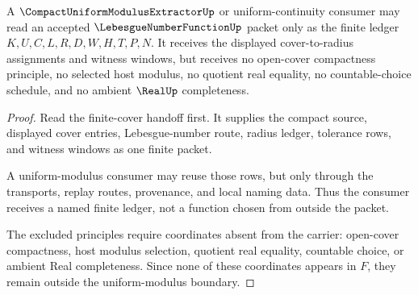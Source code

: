 \begin{theorem}
\label{thm:lebesgue-number-function-uniform-modulus-boundary}
A $\CompactUniformModulusExtractorUp$ or uniform-continuity consumer may read an accepted $\LebesgueNumberFunctionUp$ packet only as the finite ledger $K,U,C,L,R,D,W,H,T,P,N$. It receives the displayed cover-to-radius assignments and witness windows, but receives no open-cover compactness principle, no selected host modulus, no quotient real equality, no countable-choice schedule, and no ambient $\RealUp$ completeness.
\end{theorem}
\begin{proof}
Read the finite-cover handoff first. It supplies the compact source, displayed cover entries, Lebesgue-number route, radius ledger, tolerance rows, and witness windows as one finite packet.

A uniform-modulus consumer may reuse those rows, but only through the transports, replay routes, provenance, and local naming data. Thus the consumer receives a named finite ledger, not a function chosen from outside the packet.

The excluded principles require coordinates absent from the carrier: open-cover compactness, host modulus selection, quotient real equality, countable choice, or ambient Real completeness. Since none of these coordinates appears in $F$, they remain outside the uniform-modulus boundary.
\end{proof}

\begin{closurestatus}{\LebesgueNumberFunctionUp}
  \theoryclosure{\seedClosure}
  \formalstatus{\unformalizedV}
\end{closurestatus}
